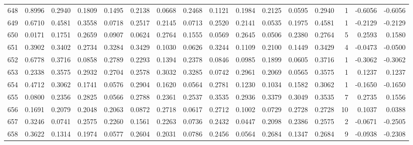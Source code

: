 \begin{tabular}{lrrrrrrrrrrrrrrr}
648 &      0.8996 &  0.2940 &  0.1809 &  0.1495 &  0.2138 &  0.0668 &  0.2468 &  0.1121 &  0.1984 &  0.2125 &   0.0595 &     0.2940 &      1 &                   -0.6056 &                    -0.6056 \\
649 &      0.6710 &  0.4581 &  0.3558 &  0.0718 &  0.2517 &  0.2145 &  0.0713 &  0.2520 &  0.2141 &  0.0535 &   0.1975 &     0.4581 &      1 &                   -0.2129 &                    -0.2129 \\
650 &      0.0171 &  0.1751 &  0.2659 &  0.0907 &  0.0624 &  0.2764 &  0.1555 &  0.0569 &  0.2645 &  0.0506 &   0.2380 &     0.2764 &      5 &                    0.2593 &                     0.1580 \\
651 &      0.3902 &  0.3402 &  0.2734 &  0.3284 &  0.3429 &  0.1030 &  0.0626 &  0.3244 &  0.1109 &  0.2100 &   0.1449 &     0.3429 &      4 &                   -0.0473 &                    -0.0500 \\
652 &      0.6778 &  0.3716 &  0.0858 &  0.2789 &  0.2293 &  0.1394 &  0.2378 &  0.0846 &  0.0985 &  0.1899 &   0.0605 &     0.3716 &      1 &                   -0.3062 &                    -0.3062 \\
653 &      0.2338 &  0.3575 &  0.2932 &  0.2704 &  0.2578 &  0.3032 &  0.3285 &  0.0742 &  0.2961 &  0.2069 &   0.0565 &     0.3575 &      1 &                    0.1237 &                     0.1237 \\
654 &      0.4712 &  0.3062 &  0.1741 &  0.0576 &  0.2904 &  0.1620 &  0.0564 &  0.2781 &  0.1230 &  0.1034 &   0.1582 &     0.3062 &      1 &                   -0.1650 &                    -0.1650 \\
655 &      0.0800 &  0.2356 &  0.2825 &  0.0566 &  0.2788 &  0.2361 &  0.2537 &  0.3535 &  0.2936 &  0.3379 &   0.3049 &     0.3535 &      7 &                    0.2735 &                     0.1556 \\
656 &      0.1691 &  0.2079 &  0.2048 &  0.2063 &  0.0872 &  0.2718 &  0.0617 &  0.2712 &  0.1002 &  0.0729 &   0.2728 &     0.2728 &     10 &                    0.1037 &                     0.0388 \\
657 &      0.3246 &  0.0741 &  0.2575 &  0.2260 &  0.1561 &  0.2263 &  0.0736 &  0.2432 &  0.0447 &  0.2098 &   0.2386 &     0.2575 &      2 &                   -0.0671 &                    -0.2505 \\
658 &      0.3622 &  0.1314 &  0.1974 &  0.0577 &  0.2604 &  0.2031 &  0.0786 &  0.2456 &  0.0564 &  0.2684 &   0.1347 &     0.2684 &      9 &                   -0.0938 &                    -0.2308 \\

\end{tabular}
